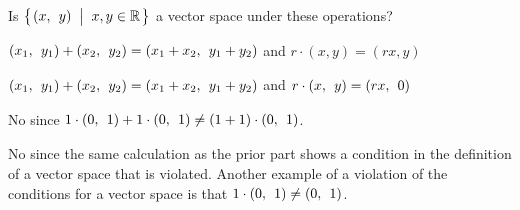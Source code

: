 
\begin{Exercise}[
name={},
title={}, 
difficulty=0,
origin={\cite{JH}}]
Is \( \set{\rowvec{x,&y}\suchthat x,y\in\Re} \) a vector space under
these operations?

\Question \( \rowvec{x_1,&y_1}+\rowvec{x_2,&y_2}=\rowvec{x_1+x_2,&y_1+y_2} \)
and \( r\cdot (x,y)=(rx,y) \)

\Question \( \rowvec{x_1,&y_1}+\rowvec{x_2,&y_2}=\rowvec{x_1+x_2,&y_1+y_2} \)
and \( r\cdot \rowvec{x,&y}=\rowvec{rx,&0} \)

\end{Exercise}

\begin{Answer}
\Question No since \( 1\cdot\rowvec{0,&1}+1\cdot\rowvec{0,&1}\neq (1+1)\cdot\rowvec{0,&1} \).

\Question No since the same calculation as the prior part shows
a condition in the definition of a vector space that is
violated.
Another example of a violation of the conditions for a
vector space is that \( 1\cdot \rowvec{0,&1} \neq \rowvec{0,&1} \).


\end{Answer}
